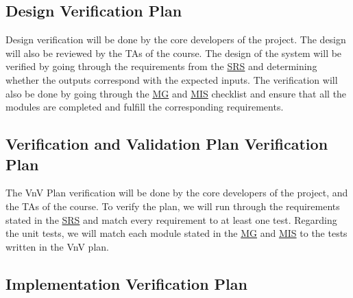 \documentclass[12pt, titlepage]{article}
\begin{document}


\subsection{Design Verification Plan}

Design verification will be done by the core developers of the project. The design will also be
reviewed by the TAs of the course. The design of the system will be verified by going through the
requirements from the
\href{https://github.com/arkinmodi/project-sayyara/blob/main/docs/SRS/SRS.pdf}{SRS} and determining
whether the outputs correspond with the expected inputs. The verification will also be done by
going through the
\href{https://github.com/arkinmodi/project-sayyara/blob/main/docs/Design/SoftArchitecture/MG.pdf}{MG}
and
\href{https://github.com/arkinmodi/project-sayyara/blob/main/docs/Design/SoftDetailedDes/MIS.pdf}{MIS}
checklist and ensure that all the modules are completed and fulfill the corresponding requirements.

\subsection{Verification and Validation Plan Verification Plan}

The VnV Plan verification will be done by the core developers of the project, and the TAs of the
course. To verify the plan, we will run through the requirements stated in the
\href{https://github.com/arkinmodi/project-sayyara/blob/main/docs/SRS/SRS.pdf}{SRS} and match every
requirement to at least one test. Regarding the unit tests, we will match each module stated in the
\href{https://github.com/arkinmodi/project-sayyara/blob/main/docs/Design/SoftArchitecture/MG.pdf}{MG}
and
\href{https://github.com/arkinmodi/project-sayyara/blob/main/docs/Design/SoftDetailedDes/MIS.pdf}{MIS}
to the tests written in the VnV plan.




\subsection{Implementation Verification Plan}
\end{document}
